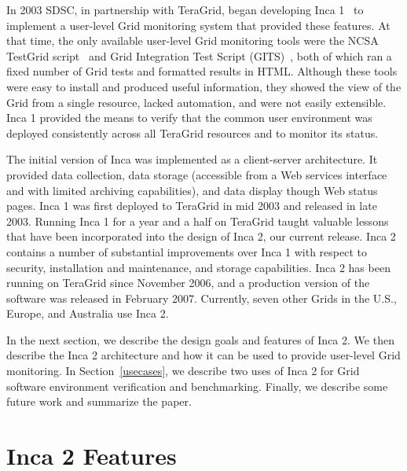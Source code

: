 \documentclass{sig-alternate}
\begin{document}

\noindent In 2003 SDSC, in partnership with TeraGrid, began developing Inca
1~\cite{inca1} to implement a user-level Grid monitoring system that provided
these features.  At that time, the only available user-level Grid
monitoring tools were the NCSA TestGrid script~\cite{ncsa-test} and
Grid Integration Test Script (GITS)~\cite{gits}, both of which ran a fixed number of Grid tests and formatted
results in HTML.  Although these tools were easy to install and produced
useful information, they showed the view of the Grid from a single
resource, lacked automation, and were not easily extensible.  Inca 1 provided
the means to verify that the common user environment was deployed consistently
across all TeraGrid resources and to monitor its status.

The initial
version of Inca was implemented as a client-server architecture.  It provided
data collection, data storage (accessible from a Web services interface and with 
limited archiving capabilities), and data display though Web status
pages.  Inca 1 was first deployed to TeraGrid in mid 2003 and released in late
2003. Running Inca 1 for a year and a half on TeraGrid taught 
valuable lessons that have been incorporated into the design of Inca 2, our
current release.  Inca 2
contains a number of substantial improvements over Inca 1 with respect to
security, installation and maintenance, and storage capabilities.  Inca 2 has
been running on TeraGrid since November 2006, and a production
version of the software was released in February 2007.  Currently, seven other Grids in the
U.S., Europe, and Australia use Inca 2.  

In the next section, we describe the design goals and features of Inca 2. 
We then describe the Inca 2 architecture and how it can be used to provide
user-level Grid monitoring.  In Section~\ref{usecases}, we describe two 
uses of Inca 2 for Grid software environment verification and benchmarking.  
Finally, we describe some future work and summarize the paper.

\section{Inca 2 Features}
  
\end{document}

